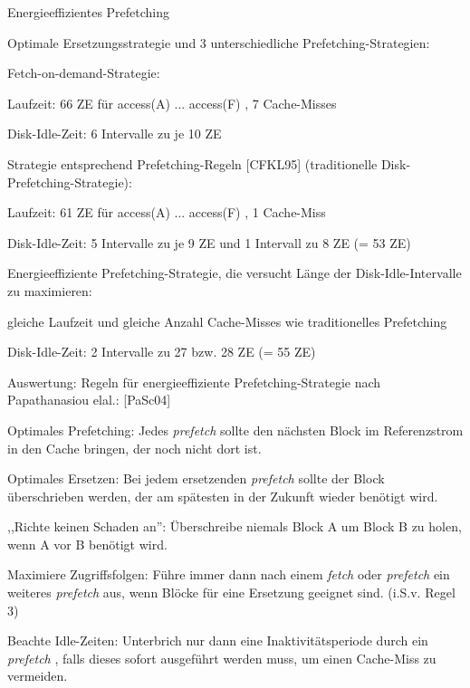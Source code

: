 \documentclass[a4paper]{article}
\begin{document}
\begin{multicols}{3}
\begin{itemize*}
\begin{itemize*}
        \end{itemize*}
        \item
        Energieeffizientes Prefetching
        \begin{itemize*}
            \item Optimale Ersetzungsstrategie und 3 unterschiedliche Prefetching-Strategien:
            \item Fetch-on-demand-Strategie: \begin{itemize*} \item   Laufzeit: 66 ZE für access(A) ... access(F) , 7 Cache-Misses \item   Disk-Idle-Zeit: 6 Intervalle zu je 10 ZE \end{itemize*}
            \item Strategie entsprechend Prefetching-Regeln {[}CFKL95{]} (traditionelle Disk-Prefetching-Strategie): \begin{itemize*} \item   Laufzeit: 61 ZE für access(A) ... access(F) , 1 Cache-Miss \item   Disk-Idle-Zeit: 5 Intervalle zu je 9 ZE und 1 Intervall zu 8 ZE (=   53 ZE) \end{itemize*}
            \item Energieeffiziente Prefetching-Strategie, die versucht Länge der Disk-Idle-Intervalle zu maximieren: \begin{itemize*} \item   gleiche Laufzeit und gleiche Anzahl Cache-Misses wie   traditionelles Prefetching \item   Disk-Idle-Zeit: 2 Intervalle zu 27 bzw. 28 ZE (= 55 ZE) \end{itemize*}
        \end{itemize*}
        \item
        Auswertung: Regeln für energieeffiziente Prefetching-Strategie nach
        Papathanasiou elal.: {[}PaSc04{]}
        \begin{enumerate*}

            \item Optimales Prefetching: Jedes \emph{prefetch} sollte den nächsten Block im Referenzstrom in den Cache bringen, der noch nicht dort ist.
            \item Optimales Ersetzen: Bei jedem ersetzenden \emph{prefetch} sollte der Block überschrieben werden, der am spätesten in der Zukunft wieder benötigt wird.
            \item ,,Richte keinen Schaden an'': Überschreibe niemals Block A um Block B zu holen, wenn A vor B benötigt wird.
            \item Maximiere Zugriffsfolgen: Führe immer dann nach einem \emph{fetch} oder \emph{prefetch} ein weiteres \emph{prefetch} aus, wenn Blöcke für eine Ersetzung geeignet sind. (i.S.v. Regel 3)
            \item Beachte Idle-Zeiten: Unterbrich nur dann eine Inaktivitätsperiode durch ein \emph{prefetch} , falls dieses sofort ausgeführt werden muss, um einen Cache-Miss zu vermeiden.
        \end{enumerate*}
    \end{itemize*}


\end{multicols}
\end{document}
